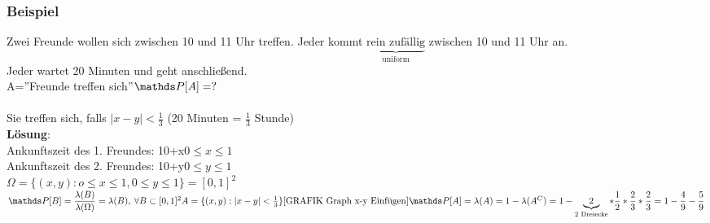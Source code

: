 \subsubsection{Beispiel} Zwei Freunde wollen sich zwischen 10 und 11 Uhr treffen. Jeder kommt $\underbrace{\text{rein zufällig}}_\text{uniform}$ zwischen 10 und 11 Uhr an.\smallskip\\
Jeder wartet 20 Minuten und geht anschließend.\medskip\\
A=''Freunde treffen sich''\hspace{1cm}$\PP[A]=?$\smallskip\\
\smallskip\\
Sie treffen sich, falls $\vert x-y\vert < \frac{1}{3}$ (20 Minuten = $\frac{1}{3}$ Stunde)\medskip\\
\textbf{Lösung}:\\
Ankunftszeit des 1. Freundes: 10+x\hspace{1cm}$0\leq x\leq 1$\\
Ankunftszeit des 2. Freundes: 10+y\hspace{1cm}$0\leq y\leq 1$\medskip\\
$\Omega = \{(x,y):o\leq x \leq 1, 0\leq y \leq 1\} = [0,1]^2$\medskip\\
\begin{math}
\PP[B] = \dfrac{\lambda(B)}{\lambda(\Omega)}=\lambda(B),\: \forall B \subset [0,1]^2\medskip\\
A = \{(x,y):\vert x -y \vert < \frac{1}{3}\}\smallskip\\
\text{\imgHere{Graph x-y}}\smallskip\\
\PP[A]=\lambda(A)=1-\lambda(A^C)
=1-\underbrace{2}_\text{2 Dreiecke}*\dfrac{1}{2}*\dfrac{2}{3}*\dfrac{2}{3}=1-\dfrac{4}{9}-\dfrac{5}{9}
\end{math}\medskip\\
